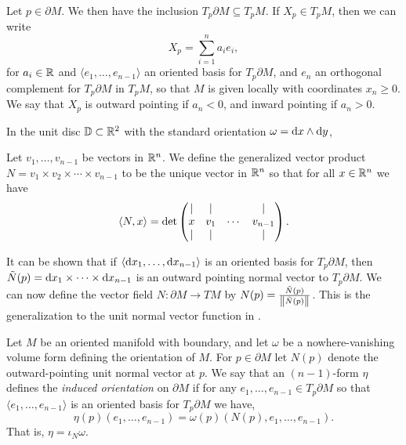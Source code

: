 \documentclass[11pt,a4paper]{article}
\begin{document}
\begin{definition}
  Let $p \in \partial M$.
  We then have the inclusion $T_p \partial M \subseteq T_p M$.
  If $X_p \in T_p M$, then we can write
  \[
    X_p = \sum_{i=1}^{n} a_i e_i,
  \]
  for $a_i \in \mathbb{R}$ and $\langle e_1,\dots,e_{n-1} \rangle$
  an oriented basis for $T_p \partial M$, and $e_n$ an orthogonal
  complement for $T_p \partial M$ in $T_p M$,
  so that $M$ is given locally with coordinates $x_n \geq 0$.
  We say that $X_p$ is outward pointing if $a_n < 0$,
  and inward pointing if $a_n > 0$.
\end{definition}

\begin{example}
  In the unit disc $\mathbb{D} \subset \mathbb{R}^2$ with the standard orientation
  $\omega = \dx \wedge \dy$,
\end{example}

\begin{definition}
  Let $v_1,\dots,v_{n-1}$ be vectors in $\mathbb{R}^n$.
  We define the generalized vector product
  $N = v_1 \times v_2 \times \cdots \times v_{n-1}$ to be the unique
  vector in $\mathbb{R}^n$ so that for all $x \in \mathbb{R}^n$ we have
  \[
    \left\langle N, x \right\rangle =
    \det
    \begin{pmatrix}
      \vert & \vert & & \vert \\
      x & v_1 & \cdots & v_{n-1} \\
      \vert & \vert & & \vert \\
    \end{pmatrix}.
  \]
\end{definition}

\begin{remark}
  It can be shown that if $\langle \dx_1,\dots,\dx_{n-1} \rangle$
  is an oriented basis for $T_p \partial M$,
  then
  $\tilde N(p) = \dx_1 \times \cdots \times \dx_{n-1}$ is an outward pointing
  normal vector to $T_p \partial M$.
  We can now define the vector field
  $N \colon \partial M \to TM$
  by $N(p) = \frac{\tilde N(p)}{\left\lVert\tilde N(p)\right\rVert}$.
  This is the generalization to
  the unit normal vector function in .
\end{remark}

\begin{definition}
  Let $M$ be an oriented manifold with boundary,
  and let $\omega$ be a nowhere-vanishing volume form defining the
  orientation of $M$.
  For $p \in \partial M$ let $N(p)$ denote the outward-pointing unit
  normal vector at $p$.
  We say that an $(n-1)$-form $\eta$ defines
  the \textit{induced orientation} on $\partial M$
  if for any $e_1,\dots,e_{n-1} \in T_p \partial M$
  so that $\langle e_1,\dots,e_{n-1} \rangle$ is an oriented basis
  for $T_p \partial M$ we have,
  \[
    \eta(p)(e_1,\dots,e_{n-1}) = \omega(p)(N(p),e_1,\dots,e_{n-1}).
  \]
  That is, $\eta = \iota_N \omega$.
\end{definition}
\end{document}
